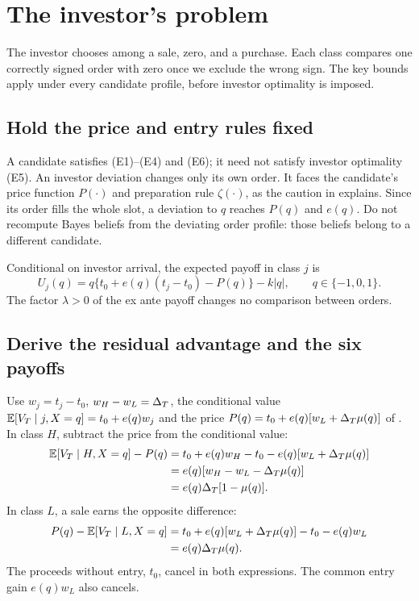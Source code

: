 \section{The investor's problem}
\label{sec:05_investor}

The investor chooses among a sale, zero, and a purchase.
Each class compares one correctly signed order with zero once we exclude the wrong sign.
The key bounds apply under every candidate profile, before investor optimality is imposed. 

\subsection{Hold the price and entry rules fixed}
\label{sec:05_investor-fixed}

A candidate satisfies (E1)--(E4) and (E6); it need not satisfy investor optimality (E5).
An investor deviation changes only its own order.
It faces the candidate's price function $P(\cdot)$ and preparation rule $\zeta(\cdot)$, as the caution in  explains.
Since its order fills the whole slot, a deviation to $q$ reaches $P(q)$ and $e(q)$.
Do not recompute Bayes beliefs from the deviating order profile: those beliefs belong to a different candidate.

Conditional on investor arrival, the expected payoff in class $j$ is
\[
U_j(q)=q\{t_0+e(q)(t_j-t_0)-P(q)\}-k|q|,
\qquad q\in\{-1,0,1\}.
\]
The factor $\lambda>0$ of the ex ante payoff changes no comparison between orders.

\subsection{Derive the residual advantage and the six payoffs}
\label{sec:05_investor-residual}

Use $w_j=t_j-t_0$, $w_H-w_L=\Delta_T$, the conditional value $\mathbb{E}[V_T\mid j,X=q]=t_0+e(q)w_j$ and the price
$P(q)=t_0+e(q)[w_L+\Delta_T\mu(q)]$ of .
In class $H$, subtract the price from the conditional value:
\begin{align*}
\mathbb{E}[V_T\mid H,X=q]-P(q)
&=t_0+e(q)w_H-t_0-e(q)[w_L+\Delta_T\mu(q)]\\
&=e(q)[w_H-w_L-\Delta_T\mu(q)]\\
&=e(q)\Delta_T[1-\mu(q)].
\end{align*}
In class $L$, a sale earns the opposite difference:
\begin{align*}
P(q)-\mathbb{E}[V_T\mid L,X=q]
&=t_0+e(q)[w_L+\Delta_T\mu(q)]-t_0-e(q)w_L\\
&=e(q)\Delta_T\mu(q).
\end{align*}
The proceeds without entry, $t_0$, cancel in both expressions.
The common entry gain $e(q)w_L$ also cancels.

